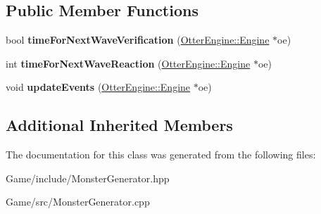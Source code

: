 \subsection*{Public Member Functions}
\begin{DoxyCompactItemize}
\item 
bool {\bfseries time\+For\+Next\+Wave\+Verification} (\hyperlink{class_otter_engine_1_1_engine}{Otter\+Engine\+::\+Engine} $\ast$oe)\hypertarget{class_monster_generator_a72133403b4b297c1678ac4baeadab003}{}\label{class_monster_generator_a72133403b4b297c1678ac4baeadab003}

\item 
int {\bfseries time\+For\+Next\+Wave\+Reaction} (\hyperlink{class_otter_engine_1_1_engine}{Otter\+Engine\+::\+Engine} $\ast$oe)\hypertarget{class_monster_generator_a4985074a7f3181a0a1efc3cf6280b9bc}{}\label{class_monster_generator_a4985074a7f3181a0a1efc3cf6280b9bc}

\item 
void {\bfseries update\+Events} (\hyperlink{class_otter_engine_1_1_engine}{Otter\+Engine\+::\+Engine} $\ast$oe)\hypertarget{class_monster_generator_a046e556d22a6f65545ca50e410c6e6c7}{}\label{class_monster_generator_a046e556d22a6f65545ca50e410c6e6c7}

\end{DoxyCompactItemize}
\subsection*{Additional Inherited Members}


The documentation for this class was generated from the following files\+:\begin{DoxyCompactItemize}
\item 
Game/include/Monster\+Generator.\+hpp\item 
Game/src/Monster\+Generator.\+cpp\end{DoxyCompactItemize}
